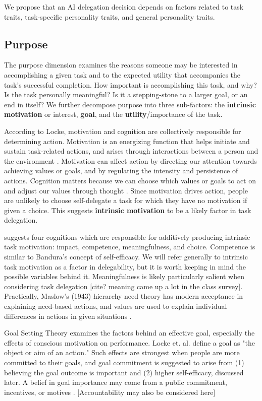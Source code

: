 \documentclass[letterpaper]{article} %
\begin{document}
We propose that an AI delegation decision depends on factors related to task traits, task-specific personality traits, and general personality traits.

\subsection{Purpose}
The purpose dimension examines the reasons someone may be interested in accomplishing a given task and to the expected utility that accompanies the task's successful completion. How important is accomplishing this task, and why? Is the task personally meaningful? Is it a stepping-stone to a larger goal, or an end in itself? We further decompose purpose into three sub-factors: the \textbf{intrinsic motivation} or interest, \textbf{goal}, and the \textbf{utility}/importance of the task.

According to Locke, motivation and cognition are collectively responsible for determining action. Motivation is an energizing function that helps initiate and sustain task-related actions, and arises through interactions between a person and the environment \cite{latham2005work}. Motivation can affect action by directing our attention towards achieving values or goals, and by regulating the intensity and persistence of actions. Cognition matters because we can choose which values or goals to act on and adjust our values through thought \cite{Locke-motivation-2000}. Since motivation drives action, people are unlikely to choose self-delegate a task for which they have no motivation if given a choice. This suggests \textbf{intrinsic motivation} to be a likely factor in task delegation.

\cite{thomas-intrinsic-motiv} suggests four cognitions which are responsible for additively producing intrinsic task motivation: impact, competence, meaningfulness, and choice. Competence is similar to Bandura's concept of self-efficacy. We will refer generally to intrinsic task motivation as a factor in delegability, but it is worth keeping in mind the possible variables behind it. Meaningfulness is likely particularly salient when considering task delegation [cite? meaning came up a lot in the class survey]. Practically, Maslow's (1943) hierarchy need theory has modern acceptance in explaining need-based actions, and values are used to explain individual differences in actions in given situations \cite{latham2005work}.

Goal Setting Theory examines the factors behind an effective goal, especially the effects of conscious motivation on performance. Locke et. al. define a goal as "the object or aim of an action." Such effects are strongest when people are more committed to their goals, and goal commitment is suggested to arise from (1) believing the goal outcome is important and (2) higher self-efficacy, discussed later. A belief in goal importance may come from a public commitment, incentives, or motives \cite{locke-goal}. [Accountability may also be considered here]
\end{document}
